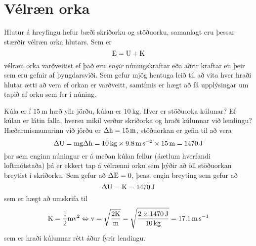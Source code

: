 \section{Vélræn orka}
Hlutur á hreyfingu hefur bæði skriðorku og stöðuorku, samanlagt eru þessar stærðir
vélræn orka hlutars. Sem er 
\begin{equation}
	\textrm{E} = \textrm{U} + \textrm{K}
\end{equation}
vélræn orka varðveitist ef það eru \emph{engir} núningskraftar eða aðrir kraftar en þeir
sem eru gefnir af þyngdarsviði. Sem gefur mjög hentuga leið til að vita hver
hraði hlutar ætti að vera ef orkan er varðveitt, samtímis er hægt að fá
upplýsingar um tapið af orku sem fer í núning.
%
\begin{formalexample}
Kúla er í $\SI{15}{\m}$ hæð yfir jörðu, kúlan er $\SI{10}{\kg}$. Hver er 
stöðuorka kúlunar? Ef kúlan er látin falla,
hversu mikil verður skriðorka og hraði kúlunnar við lendingu?
\\[4 ex]
Hæðarmismunurinn við jörðu er $\Delta\ulengthh = \SI{15}{\m}$, stöðuorkan er gefin til
að vera
\[
	\Delta\upotentialu = \umass \uacceleg \Delta \ulengthh
		= \SI{10}{\kg} \times \SI{9.8}{\m\per\s\squared}
			\times \SI{15}{\m}
		= \SI{1470}{\J}
\]
þar sem enginn núningur er á meðan kúlan fellur (áætlum hverfandi loftmótstaða) þá er
ekkert tap á vélrænni orku sem þýðir að öll stöðuorkan breytist í skriðorku. Sem gefur
að $\Delta\textrm{E} = 0$, þeas. engin breyting sem gefur að
\[
	\Delta\upotentialu = \ukinetick = \SI{1470}{\J}
\]
sem er hægt að umskrifa til
\[
	\ukinetick = \frac{1}{2} \umass \uspeed^2 
		\Leftrightarrow
		\uspeed = \sqrt{\frac{2 \ukinetick}{\umass}} 
			= \sqrt{\frac{\num{2} \times \SI{1470}{\J}
				}{\SI{10}{\kg}}}
			= \SI{17.1}{\m\per\s}
\]
sem er hraði kúlunnar rétt áður fyrir lendingu.
\end{formalexample}
%
